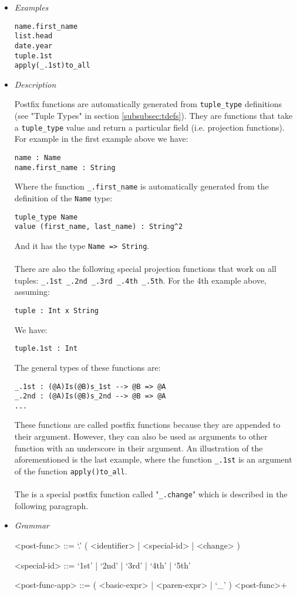 \documentclass{article}
\begin{document}
\begin{itemize}

\item \textit{Examples}
\begin{verbatim}
name.first_name
list.head
date.year
tuple.1st
apply(_.1st)to_all
\end{verbatim}

\item \textit{Description} 

Postfix functions are automatically generated from \texttt{tuple_type}
definitions (see "Tuple Types" in section \ref{subsubsec:tdefs}). They are
functions that take a \texttt{tuple_type} value and return a particular field
(i.e. projection functions). For example in the first example above we have:
\begin{verbatim}
name : Name
name.first_name : String
\end{verbatim}
Where the function \texttt{_.first_name} is automatically generated from the
definition of the \texttt{Name} type:
\begin{verbatim}
tuple_type Name
value (first_name, last_name) : String^2
\end{verbatim}
And it has the type \texttt{Name => String}.
\\\\
There are also the following special projection functions that work on all
tuples: \texttt{_.1st _.2nd _.3rd _.4th _.5th}.
For the 4th example above, assuming:
\begin{verbatim}
tuple : Int x String
\end{verbatim}
We have:
\begin{verbatim}
tuple.1st : Int
\end{verbatim}
The general types of these functions are:
\begin{verbatim}
_.1st : (@A)Is(@B)s_1st --> @B => @A
_.2nd : (@A)Is(@B)s_2nd --> @B => @A
...
\end{verbatim}
These functions are called postfix functions because they are appended to their
argument. However, they can also be used as arguments to other function with an
underscore in their argument.  An illustration of the aforementioned is the
last example, where the function \texttt{_.1st} is an argument of the function
\texttt{apply()to_all}.
\\\\
The is a special postfix function called "\texttt{_.change}" which is described
in the following paragraph.

\item \textit{Grammar}
\begin{grammar}
<post-func> ::= `.' ( <identifier> | <special-id> | <change> )

<special-id> ::= `1st' | `2nd' | `3rd' | `4th' | `5th'

<post-func-app> ::= ( <basic-expr> | <paren-expr> | `_' ) <post-func>+
\end{grammar}

\end{itemize}
\end{document}
